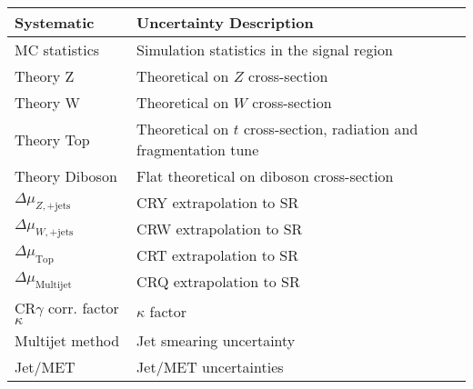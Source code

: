 \begin{table}[tbp]
\begin{center}
\begin{tabular}{| l | l |}
\hline
Systematic                        & Uncertainty Description                                                   \\
\hline\hline
MC statistics                     & Simulation statistics in the signal region                                \\ \hline
Theory Z                          & Theoretical  on $Z$ cross-section                                         \\ \hline
Theory W                          & Theoretical  on $W$ cross-section                                         \\ \hline
Theory Top                        & Theoretical  on $t$ cross-section, radiation and fragmentation tune       \\ \hline
Theory Diboson                    & Flat theoretical on diboson cross-section                                 \\ \hline
$\Delta\mu_{Z,\mathrm{+jets}}$    & CRY extrapolation to SR                                                   \\ \hline
$\Delta\mu_{W,\mathrm{+jets}}$    & CRW extrapolation to SR                                                   \\ \hline
$\Delta\mu_{\mathrm{ Top}}$       & CRT extrapolation to SR                                                   \\ \hline
$\Delta\mu_{\mathrm{ Multijet}}$ & CRQ extrapolation to SR                                                   \\ \hline
CR$\gamma$ corr. factor $\kappa$  & $\kappa$ factor                                                           \\ \hline
Multijet method                   & Jet smearing uncertainty                                                  \\ \hline
Jet/MET                           & Jet/MET uncertainties                                                     \\ \hline

\end{tabular}
\end{center}
\end{table}

